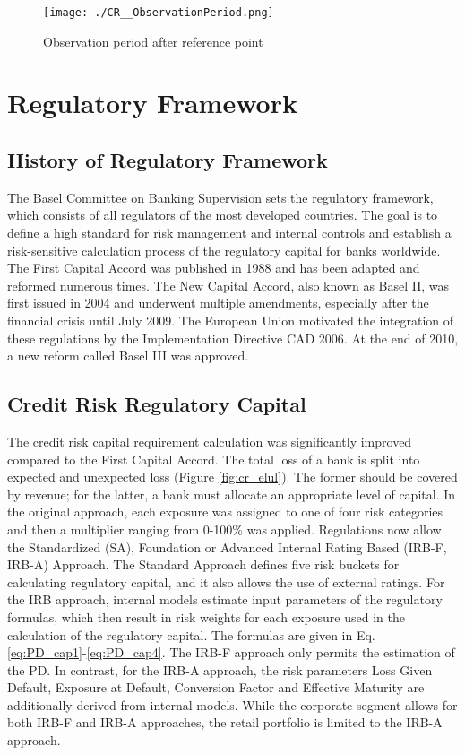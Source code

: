 \begin{figure}[H]
	\centering
	\texttt{[image: ./CR\_\_ObservationPeriod.png]}
    \caption{Observation period after reference point}
    \label{fig:cr_timeperiod}
\end{figure}

\section{Regulatory Framework}

\subsection{History of Regulatory Framework}

The Basel Committee on Banking Supervision sets the regulatory framework, which consists of all regulators of the most developed countries. The goal is to define a high standard for risk management and internal controls and establish a risk-sensitive calculation process of the regulatory capital for banks worldwide. The First Capital Accord was published in 1988 and has been adapted and reformed numerous times. The New Capital Accord, also known as Basel II, was first issued in 2004 and underwent multiple amendments, especially after the financial crisis until July 2009. The European Union motivated the integration of these regulations by the Implementation Directive CAD 2006. At the end of 2010, a new reform called Basel III was approved. \cite[p.~13]{Witzany:2017}

\subsection{Credit Risk Regulatory Capital}

The credit risk capital requirement calculation was significantly improved compared to the First Capital Accord. The total loss of a bank is split into expected and unexpected loss (Figure \ref{fig:cr_elul}). The former should be covered by revenue; for the latter, a bank must allocate an appropriate level of capital. In the original approach, each exposure was assigned to one of four risk categories and then a multiplier ranging from 0-100\% was applied. Regulations now allow the Standardized (SA), Foundation or Advanced Internal Rating Based (IRB-F, IRB-A) Approach. The Standard Approach defines five risk buckets for calculating regulatory capital, and it also allows the use of external ratings. For the IRB approach, internal models estimate input parameters of the regulatory formulas, which then result in risk weights for each exposure used in the calculation of the regulatory capital. The formulas are given in Eq. \ref{eq:PD_cap1}-\ref{eq:PD_cap4}. The IRB-F approach only permits the estimation of the PD. In contrast, for the IRB-A approach, the risk parameters Loss Given Default, Exposure at Default, Conversion Factor and Effective Maturity are additionally derived from internal models. While the corporate segment allows for both IRB-F and IRB-A approaches, the retail portfolio is limited to the IRB-A approach. \cite[15-17]{Witzany:2017} \cite[p.~59]{BCBS:2004}


